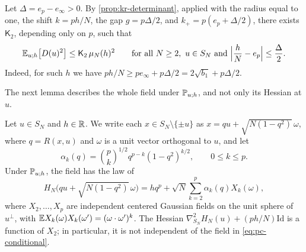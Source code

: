 Let $\Delta=e_p-e_\infty>0$. By \cref{prop:kr-determinant}, applied with the radius equal to one, the shift $k=ph/N$, the gap $g=p\Delta/2$, and $k_+=p(e_p+\Delta/2)$, there exists $\mathsf K_2$, depending only on $p$, such that
\begin{equation}\label{eq:pc-det}
\mathbb E_{u;h}\bigl[D(u)^2\bigr]\le \mathsf K_2\,\mu_N(h)^2\qquad\text{for all }N\ge2,\ u\in S_N\text{ and }\Bigl|\frac hN-e_p\Bigr|\le\frac\Delta2.
\end{equation}
Indeed, for such $h$ we have $ph/N\ge pe_\infty+p\Delta/2=2\sqrt{b_1}+p\Delta/2$.

The next lemma describes the whole field under $\mathbb P_{u;h}$, and not only its Hessian at $u$.

\begin{lemma}\label{lem:pc-conditional}
Let $u\in S_N$ and $h\in\mathbb R$. We write each $x\in S_N\setminus\{\pm u\}$ as $x=qu+\sqrt{N(1-q^2)}\,\omega$, where $q=R(x,u)$ and $\omega$ is a unit vector orthogonal to $u$, and let
\[
\alpha_k(q)=\binom pk^{1/2}q^{p-k}(1-q^2)^{k/2},\qquad 0\le k\le p.
\]
Under $\mathbb P_{u;h}$, the field has the law of
\begin{equation}\label{eq:pc-conditional}
H_N\bigl(qu+\sqrt{N(1-q^2)}\,\omega\bigr)=hq^p+\sqrt N\sum_{k=2}^p\alpha_k(q)X_k(\omega),
\end{equation}
where $X_2,\dots,X_p$ are independent centered Gaussian fields on the unit sphere of $u^\perp$, with $\mathbb E X_k(\omega)X_k(\omega')=(\omega\cdot\omega')^k$. The Hessian $\nabla^2_{S_N}H_N(u)+(ph/N)\mathrm{Id}$ is a function of $X_2$; in particular, it is not independent of the field in \eqref{eq:pc-conditional}.
\end{lemma}

